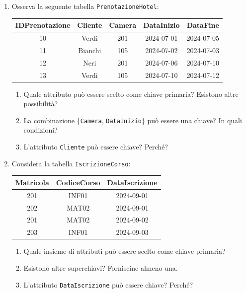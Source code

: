 \documentclass[a4paper,12pt]{article}
\begin{document}
\begin{enumerate}
\vspace{0.5cm}

\item 

Osserva la seguente tabella \texttt{PrenotazioneHotel}:
\begin{center}
\begin{tabular}{|c|c|c|c|c|}
\hline
\textbf{IDPrenotazione} & \textbf{Cliente} & \textbf{Camera} & \textbf{DataInizio} & \textbf{DataFine} \\
\hline
10 & Verdi & 201 & 2024-07-01 & 2024-07-05 \\
11 & Bianchi & 105 & 2024-07-02 & 2024-07-03 \\
12 & Neri & 201 & 2024-07-06 & 2024-07-10 \\
13 & Verdi & 105 & 2024-07-10 & 2024-07-12 \\
\hline
\end{tabular}
\end{center}

\begin{enumerate}
    \item Quale attributo può essere scelto come chiave primaria? Esistono altre possibilità?
    \item La combinazione \{\texttt{Camera}, \texttt{DataInizio}\} può essere una chiave? In quali condizioni?
    \item L’attributo \texttt{Cliente} può essere chiave? Perché?
\end{enumerate}

\vspace{0.5cm}

\item 

Considera la tabella \texttt{IscrizioneCorso}:
\begin{center}
\begin{tabular}{|c|c|c|}
\hline
\textbf{Matricola} & \textbf{CodiceCorso} & \textbf{DataIscrizione} \\
\hline
201 & INF01 & 2024-09-01 \\
202 & MAT02 & 2024-09-01 \\
201 & MAT02 & 2024-09-02 \\
203 & INF01 & 2024-09-03 \\
\hline
\end{tabular}
\end{center}

\begin{enumerate}
    \item Quale insieme di attributi può essere scelto come chiave primaria?
    \item Esistono altre superchiavi? Forniscine almeno una.
    \item L’attributo \texttt{DataIscrizione} può essere chiave? Perché?
\end{enumerate}



\end{enumerate}
\end{document}
